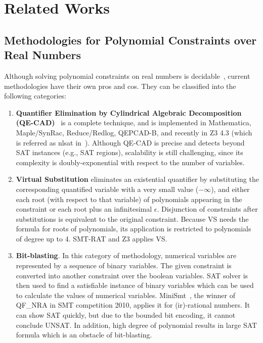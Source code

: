 \chapter{Related Works} \label{chap:related}
\section{Methodologies for Polynomial Constraints over Real Numbers}
Although solving polynomial constraints on real numbers is decidable~\cite{tarski}, current methodologies have their own pros and cos. They can be classified into the following categories: 
\begin{enumerate}
\item \textbf{Quantifier Elimination by Cylindrical Algebraic Decomposition (QE-CAD)}~\cite{qecad} 
is a complete technique, and 
is implemented in Mathematica, Maple/SynRac, Reduce/Redlog, QEPCAD-B, and recently 
in
Z3 4.3 (which is referred as nlsat in~\cite{Jovanovic13}).
Although QE-CAD is precise and detects beyond SAT instances (e.g., SAT regions), 
scalability is still challenging, since its complexity is doubly-exponential with respect to the number of variables. 

\item \textbf{Virtual Substitution } eliminates an existential quantifier by substituting the corresponding quantified variable with a very small value ($-\infty$), and either each root (with respect to that variable) of polynomials appearing in the constraint or each root plus an infinitesimal $\epsilon$. Disjunction of constraints after substitutions is equivalent to the original constraint. Because VS needs the formula for roots of polynomials, its application is restricted to polynomials of degree up to 4. SMT-RAT and  
Z3 \cite{PBM12} applies VS.

\item \textbf{Bit-blasting}. 
In this category of methodology, numerical variables are represented by a sequence of binary variables. The given constraint is converted into another constraint over the boolean variables. SAT solver is then used to find a satisfiable instance of binary variables which can be used to calculate the values of numerical variables.  MiniSmt~\cite{Zankl:2010:SNR:1939141.1939168}, the winner of QF\_NRA in SMT competition 2010, 
applies it for (ir)-rational numbers.
It can show SAT quickly, but due to the bounded bit encoding, 
it cannot conclude UNSAT. In addition, high degree of polynomial results in large SAT formula which is an obstacle of bit-blasting.


\end{enumerate}
